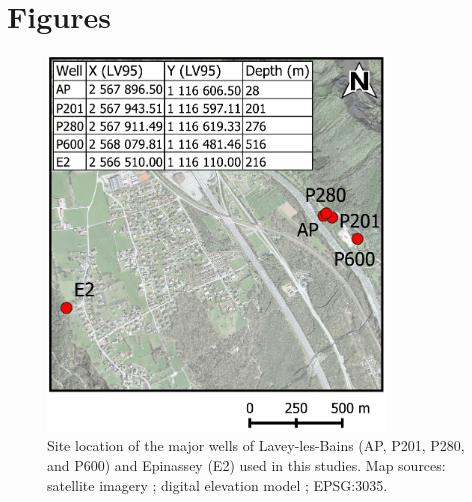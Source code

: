 \section{Figures}
\begin{center}
\vfill
\begin{figure}[H]
\centering
\includegraphics[width=0.8\textwidth]{chapters/06_appendix/SI_C2/Lavey_zoom.pdf}
\caption{Site location of the major wells of Lavey-les-Bains (AP, P201, P280, and P600) and Epinassey (E2) used in this studies.
Map sources: satellite imagery \citep{swisstopo2024swissimage}; digital elevation model \citep{swisstopo2024swissalti3D}; EPSG:3035.}
\label{figSI:map_Lavey}
\end{figure}
\vfill 
\end{center}

